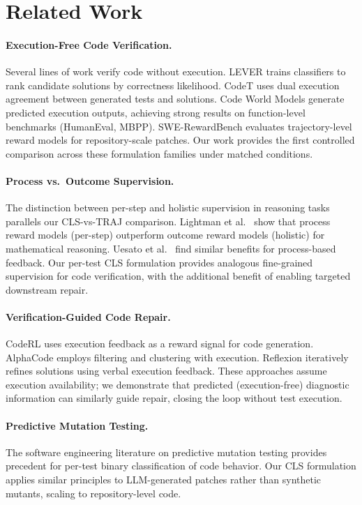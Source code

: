 \documentclass[11pt,a4paper]{article}
\begin{document}
\section{Related Work}

\paragraph{Execution-Free Code Verification.}
Several lines of work verify code without execution. LEVER \cite{ni2023lever} trains classifiers to rank candidate solutions by correctness likelihood. CodeT \cite{chen2023codet} uses dual execution agreement between generated tests and solutions. Code World Models \cite{gu2024cwm} generate predicted execution outputs, achieving strong results on function-level benchmarks (HumanEval, MBPP). SWE-RewardBench \cite{zhang2025swerewardbench} evaluates trajectory-level reward models for repository-scale patches. Our work provides the first controlled comparison across these formulation families under matched conditions.

\paragraph{Process vs.\ Outcome Supervision.}
The distinction between per-step and holistic supervision in reasoning tasks parallels our CLS-vs-TRAJ comparison. Lightman et al.\ \cite{lightman2023lets} show that process reward models (per-step) outperform outcome reward models (holistic) for mathematical reasoning. Uesato et al.\ \cite{uesato2022solving} find similar benefits for process-based feedback. Our per-test CLS formulation provides analogous fine-grained supervision for code verification, with the additional benefit of enabling targeted downstream repair.

\paragraph{Verification-Guided Code Repair.}
CodeRL \cite{le2022coderl} uses execution feedback as a reward signal for code generation. AlphaCode \cite{li2022alphacode} employs filtering and clustering with execution. Reflexion \cite{shinn2023reflexion} iteratively refines solutions using verbal execution feedback. These approaches assume execution availability; we demonstrate that predicted (execution-free) diagnostic information can similarly guide repair, closing the loop without test execution.

\paragraph{Predictive Mutation Testing.}
The software engineering literature on predictive mutation testing \cite{zhang2018predictive} provides precedent for per-test binary classification of code behavior. Our CLS formulation applies similar principles to LLM-generated patches rather than synthetic mutants, scaling to repository-level code.
\end{document}
